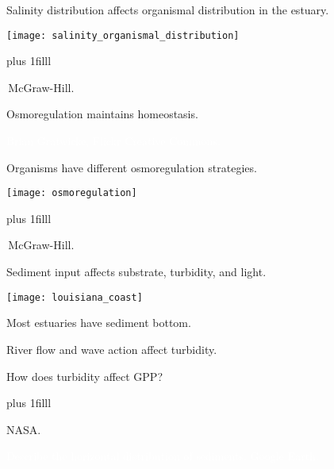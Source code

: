 \documentclass[t]{beamer}
\begin{document}
%
\begin{frame}[t]{Salinity distribution affects organismal distribution in the estuary.}
	
	\vspace*{-\baselineskip}
	
		\begin{center}
			\texttt{[image: salinity\_organismal\_distribution]}
		\end{center}

	\vskip0pt plus 1filll

	\tiny\textcopyright\,McGraw-Hill.
\end{frame}
%
\begin{frame}[t]{Osmoregulation maintains homeostasis.}

	\hangpara{}

	\hangpara{}
	
	\hangpara{}

\end{frame}

{
\begin{frame}[b]{}
\hfill\tiny\textcolor{white}{Brian Gratwicke, Flickr Creative Commons.}
\end{frame}
}
%
\begin{frame}[t]{Organisms have different osmoregulation strategies.}
	
	\vspace*{-\baselineskip}
	
		\begin{center}
			\texttt{[image: osmoregulation]}
		\end{center}

	\vskip0pt plus 1filll

	\tiny\textcopyright\,McGraw-Hill.
\end{frame}
%
\begin{frame}[t]{Sediment input affects substrate, turbidity, and light.}
	
	\vspace*{-\baselineskip}
	
	\begin{multicols}{2}
		\begin{center}
			\texttt{[image: louisiana\_coast]}
		\end{center}
	\columnbreak
	
		\hangpara Most estuaries have sediment bottom.
		
		\hangpara River flow and wave action affect turbidity.
		
		\hangpara How does turbidity affect GPP?
		
	\end{multicols}

	\vskip0pt plus 1filll

	\tiny NASA.
\end{frame}
%
{
\begin{frame}[b]{\textcolor{white}{Describe the horizontal distribution of sediments.}}
\tiny\textcolor{white}{Google Earth.}
\end{frame}
}
\end{document}
